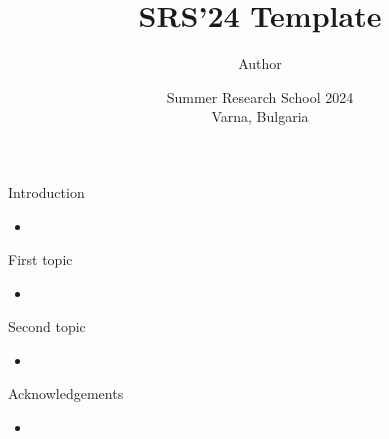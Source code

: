 \documentclass[pdf]{beamer}
\title[Short title]{SRS'24 Template}
\author[Short author]{Author %
}
\date[SRS'24]{Summer Research School 2024\\Varna, Bulgaria}
\begin{document}
\begin{frame}
\thispagestyle{empty}          %
\titlepage
\end{frame}
\addtocounter{framenumber}{-1} %

\begin{frame}{Introduction}
    \begin{itemize}
        \item 
    \end{itemize}
\end{frame}

\begin{frame}{First topic}
    \begin{itemize}
        \item 
    \end{itemize}
\end{frame}

\begin{frame}{Second topic}
    \begin{itemize}
        \item 
    \end{itemize}
\end{frame}

\begin{frame}{Acknowledgements}
    \begin{itemize}
        \item 
    \end{itemize}
\end{frame}
\end{document}
